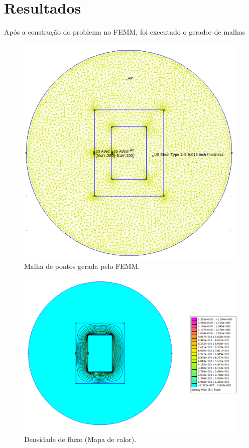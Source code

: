 \section{Resultados}
Após a construção do problema no FEMM, foi executado o gerador de malhas
\begin{figure}[H]
\centering
\includegraphics[scale=0.5]{img/femm_2.png}
\caption[Malha de pontos gerada pelo FEMM]{Malha de pontos gerada pelo FEMM.}
\label{femm2}
\end{figure}

\begin{figure}[H]
\centering
\includegraphics[scale=0.5]{img/femm_4.png}
\caption[Densidade de fluxo (Mapa de calor)]{Densidade de fluxo (Mapa de calor).}
\label{femm3}
\end{figure}


